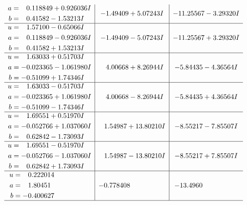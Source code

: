 \documentclass[1p]{elsarticle_modified}
\theoremstyle{definition}
\begin{document}
$$\begin{array}{c|c|c}
\begin{aligned}
a &= \phantom{-}0.118849 + 0.926036 I \\
b &= \phantom{-}0.41582 - 1.53213 I\end{aligned}
 & -1.49409 + 5.07243 I & -11.25567 - 3.29320 I \\ \hline\begin{aligned}
u &= \phantom{-}1.57100 - 0.65066 I \\
a &= \phantom{-}0.118849 - 0.926036 I \\
b &= \phantom{-}0.41582 + 1.53213 I\end{aligned}
 & -1.49409 - 5.07243 I & -11.25567 + 3.29320 I \\ \hline\begin{aligned}
u &= \phantom{-}1.63033 + 0.51703 I \\
a &= -0.023365 - 1.061980 I \\
b &= -0.51099 + 1.74346 I\end{aligned}
 & \phantom{-}4.00668 + 8.26944 I & -5.84435 - 4.36564 I \\ \hline\begin{aligned}
u &= \phantom{-}1.63033 - 0.51703 I \\
a &= -0.023365 + 1.061980 I \\
b &= -0.51099 - 1.74346 I\end{aligned}
 & \phantom{-}4.00668 - 8.26944 I & -5.84435 + 4.36564 I \\ \hline\begin{aligned}
u &= \phantom{-}1.69551 + 0.51970 I \\
a &= -0.052766 + 1.037060 I \\
b &= \phantom{-}0.62842 - 1.73093 I\end{aligned}
 & \phantom{-}1.54987 + 13.80210 I & -8.55217 - 7.85507 I \\ \hline\begin{aligned}
u &= \phantom{-}1.69551 - 0.51970 I \\
a &= -0.052766 - 1.037060 I \\
b &= \phantom{-}0.62842 + 1.73093 I\end{aligned}
 & \phantom{-}1.54987 - 13.80210 I & -8.55217 + 7.85507 I \\ \hline\begin{aligned}
u &= \phantom{-}0.222014\phantom{ +0.000000I} \\
a &= \phantom{-}1.80451\phantom{ +0.000000I} \\
b &= -0.400627\phantom{ +0.000000I}\end{aligned}
 & -0.778408\phantom{ +0.000000I} & -13.4960\phantom{ +0.000000I}\\
 \hline 
 \end{array}$$\newpage\newpage\renewcommand{\arraystretch}{1}
\end{document}
